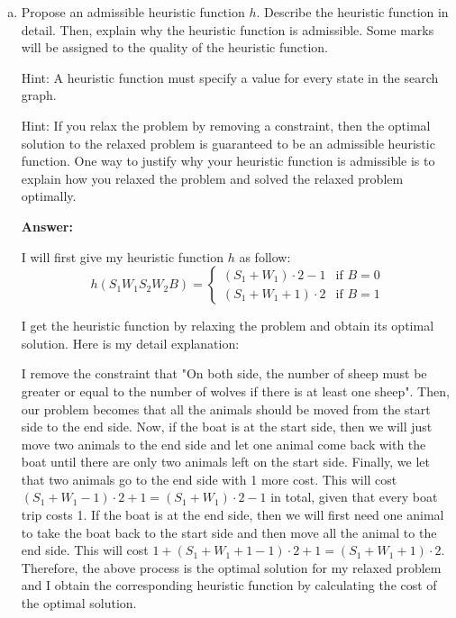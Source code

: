\documentclass[12pt]{article}
\begin{document}
\begin{enumerate}[(a)]
\item
\label{mc_part_heuristic}

Propose an admissible heuristic function $h$. Describe the heuristic function in detail. Then, explain why the heuristic function is admissible. Some marks will be assigned to the quality of the heuristic function.

Hint: A heuristic function must specify a value for every state in the search graph.

Hint: If you relax the problem by removing a constraint, then the optimal solution to the relaxed problem is guaranteed to be an admissible heuristic function. One way to justify why your heuristic function is admissible is to explain how you relaxed the problem and solved the relaxed problem optimally. 

{\bf Answer:}

I will first give my heuristic function $h$ as follow:
\begin{equation}
 h(S_1W_1S_2W_2B) = 
 				\begin{cases}
				(S_1 + W_1) \cdot 2 - 1 & \text{if $B = 0$}\\
				(S_1 + W_1 + 1) \cdot 2 & \text{if $B = 1$}
				\end{cases}
\end{equation}

I get the heuristic function by relaxing the problem and obtain its optimal solution. Here is my detail explanation:

I remove the constraint that "On both side, the number of sheep must be greater or equal to the number of wolves if there is at least one sheep". Then, our problem becomes that all the animals should be moved from the start side to the end side. Now, if the boat is at the start side, then we will just move two animals to the end side and let one animal come back with the boat until there are only two animals left on the start side. Finally, we let that two animals go to the end side with 1 more cost. This will cost $(S_1 + W_1 - 1) \cdot 2 + 1 = (S_1 + W_1) \cdot 2 - 1$ in total, given that every boat trip costs 1. If the boat is at the end side, then we will first need one animal to take the boat back to the start side and then move all the animal to the end side. This will cost $1 + (S_1 + W_1 + 1 - 1) \cdot 2 + 1 = (S_1 + W_1 + 1) \cdot 2$. Therefore, the above process is the optimal solution for my relaxed problem and I obtain the corresponding heuristic function by calculating the cost of the optimal solution.


\end{enumerate}
\end{document}
